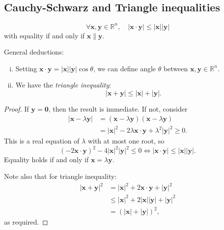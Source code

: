 \documentclass[10pt]{article}
\def\le{\leqslant}
\def\ge{\geqslant}
\begin{document}
    \subsection{Cauchy-Schwarz and Triangle inequalities}
    \begin{proposition}\label{prop:cauchy-schwarz}
        \[
            \forall \mathbf{x}, \mathbf{y}\in \mathbb{R}^n,\quad |\mathbf{x}\cdot \mathbf{y}|\le |\mathbf{x}| | \mathbf{y}|
        \]
        with equality if and only if $ \mathbf{x}\parallel \mathbf{y} $.
    \end{proposition}
    General deductions:
    \begin{enumerate}[(i).]
        \item Setting $ \mathbf{x}\cdot \mathbf{y}=|\mathbf{x}||\mathbf{y}|\cos \theta $, we can define angle $ \theta $ between $ \mathbf{x},\mathbf{y}\in \mathbb{R}^n $.
        \item We have the \textit{triangle inequality}:
        \[
            |\mathbf{x}+\mathbf{y}|\le|\mathbf{x}|+|\mathbf{y}|
        .\]
    \end{enumerate}
    \begin{proof}
        If $ \mathbf{y}=\mathbf{0} $, then the result is immediate. If not, consider
        \[
            \begin{aligned}
                 \left| \mathbf{x}-\lambda \mathbf{y} \right|&= (\mathbf{x}-\lambda \mathbf{y})(\mathbf{x}-\lambda \mathbf{y})\\
                 &= \left| \mathbf{x} \right|^2-2\lambda \mathbf{x}\cdot \mathbf{y}+\lambda^2 |\mathbf{y}|^2\ge 0.
            \end{aligned}
        \]
        This is a real equation of $\lambda$ with at most one root, so 
        \[
            (-2 \mathbf{x}\cdot \mathbf{y})^2-4|\mathbf{x}|^2|\mathbf{y}|^2\le 0 \Longleftrightarrow |\mathbf{x}\cdot \mathbf{y}|\le |\mathbf{x}| | \mathbf{y}|
        .\]
        Equality holds if and only if $ \mathbf{x}=\lambda \mathbf{y} $.

        Note also that for triangle inequality:
        \[
            \begin{aligned}
                 |\mathbf{x}+\mathbf{y}|^2&= |\mathbf{x}|^2+2 \mathbf{x}\cdot \mathbf{y}+|\mathbf{y}|^2\\
                 &\le |\mathbf{x}|^2+2 |\mathbf{x}| | \mathbf{y}|+|\mathbf{y}|^2\\
                 &=(|\mathbf{x}|+|\mathbf{y}|)^2,
            \end{aligned}
        \]
        as required.
    \end{proof}
\end{document}

